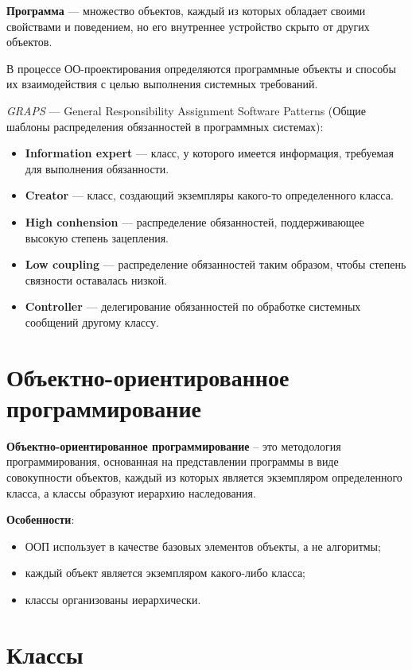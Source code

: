 \documentclass[a4paper,12pt,oneside]{extbook}
\begin{document}
\textbf{Программа} — множество объектов, каждый из которых обладает своими свойствами и поведением, но его внутреннее устройство скрыто от других объектов.

В процессе ОО-проектирования определяются программные объекты и способы их взаимодействия с целью выполнения системных требований.

\textit{GRAPS} — General Responsibility Assignment Software Patterns (Общие шаблоны распределения обязанностей в программных системах):
\begin{itemize}
    \item \textbf{Information expert} — класс, у которого имеется информация, требуемая для выполнения обязанности.
    \item \textbf{Creator} — класс, создающий экземпляры какого-то определенного класса.
    \item \textbf{High conhension} — распределение обязанностей, поддерживающее высокую степень зацепления.
    \item \textbf{Low coupling} — распределение обязанностей таким образом, чтобы степень связности оставалась низкой.
    \item \textbf{Controller} — делегирование обязанностей по обработке системных сообщений другому классу.
\end{itemize}

\section{Объектно-ориентированное программирование}%
\label{sec:Объектно-ориентированное программирование}

\textbf{Объектно-ориентированное программирование} – это методология программирования, основанная на представлении программы в виде совокупности объектов, каждый из которых является экземпляром определенного класса, а классы образуют иерархию наследования.

\textbf{Особенности}:
\begin{itemize}
    \item ООП использует в качестве базовых элементов объекты, а не алгоритмы;
    \item каждый объект является экземпляром какого-либо класса;
    \item классы организованы иерархически.
\end{itemize}

\section{Классы}%
\label{sec:Классы}
\end{document}
